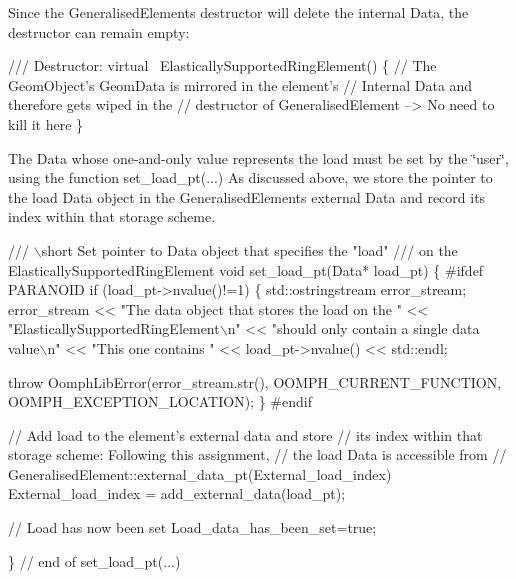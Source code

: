 Since the {\ttfamily Generalised\+Element\textquotesingle{}s} destructor will delete the internal {\ttfamily Data}, the destructor can remain empty\+: 
\begin{DoxyCodeInclude}
 \textcolor{comment}{/// Destructor: }
 \textcolor{keyword}{virtual} ~ElasticallySupportedRingElement()
  \{
   \textcolor{comment}{// The GeomObject's GeomData is mirrored in the element's}
   \textcolor{comment}{// Internal Data and therefore gets wiped in the}
   \textcolor{comment}{// destructor of GeneralisedElement --> No need to kill it here}
  \}

\end{DoxyCodeInclude}


The {\ttfamily Data} whose one-\/and-\/only value represents the load must be set by the \char`\"{}user\char`\"{}, using the function {\ttfamily set\+\_\+load\+\_\+pt}(...) As discussed above, we store the pointer to the load {\ttfamily Data} object in the {\ttfamily Generalised\+Element\textquotesingle{}s} external {\ttfamily Data} and record its index within that storage scheme.

 
\begin{DoxyCodeInclude}
 \textcolor{comment}{/// \(\backslash\)short Set pointer to Data object that specifies the "load"}
\textcolor{comment}{ /// on the ElasticallySupportedRingElement}
\textcolor{comment}{} \textcolor{keywordtype}{void} set\_load\_pt(Data* load\_pt)
  \{
\textcolor{preprocessor}{#ifdef PARANOID}
   \textcolor{keywordflow}{if} (load\_pt->nvalue()!=1)
    \{
     std::ostringstream error\_stream;
     error\_stream << \textcolor{stringliteral}{"The data object that stores the load on the "}
                  << \textcolor{stringliteral}{"ElasticallySupportedRingElement\(\backslash\)n"}
                  << \textcolor{stringliteral}{"should only contain a single data value\(\backslash\)n"}
                  << \textcolor{stringliteral}{"This one contains "} << load\_pt->nvalue() << std::endl;

     \textcolor{keywordflow}{throw} OomphLibError(error\_stream.str(),
                         OOMPH\_CURRENT\_FUNCTION,
                         OOMPH\_EXCEPTION\_LOCATION);
    \}
\textcolor{preprocessor}{#endif}

   \textcolor{comment}{// Add load to the element's external data and store}
   \textcolor{comment}{// its index within that storage scheme: Following this assignment, }
   \textcolor{comment}{// the load Data is accessible from}
   \textcolor{comment}{// GeneralisedElement::external\_data\_pt(External\_load\_index)}
   External\_load\_index = add\_external\_data(load\_pt);

   \textcolor{comment}{// Load has now been set}
   Load\_data\_has\_been\_set=\textcolor{keyword}{true};

  \} \textcolor{comment}{// end of set\_load\_pt(...)}

\end{DoxyCodeInclude}


